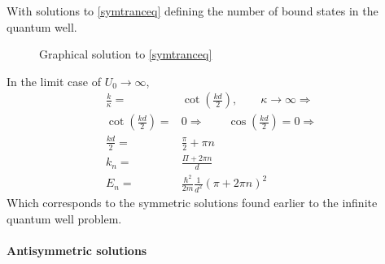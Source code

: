 				With solutions to \ref{symtranceq} defining the number of bound states in the quantum well. 
				\begin{figure}[!h]
					\centering
					
					\caption{Graphical solution to \ref{symtranceq}}
				\end{figure}
				
				In the limit case of $U_0 \rightarrow \infty$,
				\begin{align}
					\frac{k}{\kappa} =& \cot(\frac{kd}{2}),\qquad \kappa \rightarrow \infty \Rightarrow \\
					\cot(\frac{kd}{2}) =& 0 \Rightarrow\qquad	\cos(\frac{kd}{2}) = 0 \Rightarrow\\
					\frac{kd}{2} =& \frac{\pi}{2} + \pi n \\
					k_n =& \frac{\Pi + 2\pi n}{d} \\
					E_n =& \frac{\hbar^2}{2m}\frac{1}{d^2}\left(\pi + 2\pi n\right)^2
				\end{align}
				Which corresponds to the symmetric solutions found earlier to the infinite quantum well problem.
				
			\paragraph{Antisymmetric solutions}
				
